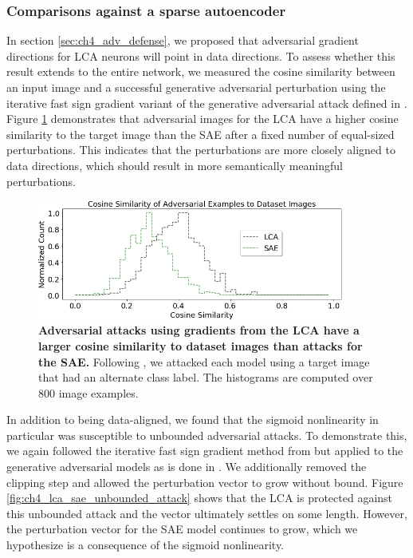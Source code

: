 \subsubsection{Comparisons against a sparse autoencoder}
In section \ref{sec:ch4_adv_defense}, we proposed that adversarial gradient directions for LCA neurons will point in data directions. To assess whether this result extends to the entire network, we measured the cosine similarity between an input image and a successful generative adversarial perturbation using the iterative fast sign gradient \parencite{kurakin2016adversarial} variant of the generative adversarial attack defined in \parencite{kos2018adversarial}. Figure \ref{fig:ch4_cosine_similarity} demonstrates that adversarial images for the LCA have a higher cosine similarity to the target image than the SAE after a fixed number of equal-sized perturbations. This indicates that the perturbations are more closely aligned to data directions, which should result in more semantically meaningful perturbations.

\begin{figure}[h]
    \centering
    \includegraphics[width=0.9\textwidth]{figures/cosyne_similarity.png}
    \caption{\textbf{Adversarial attacks using gradients from the LCA have a larger cosine similarity to dataset images than attacks for the SAE.} Following \parencite{kos2018adversarial, kurakin2016adversarial}, we attacked each model using a target image that had an alternate class label. The histograms are computed over 800 image examples.}
    \label{fig:ch4_cosine_similarity}
\end{figure}

In addition to being data-aligned, we found that the sigmoid nonlinearity in particular was susceptible to unbounded adversarial attacks. To demonstrate this, we again followed the iterative fast sign gradient method from \parencite{kurakin2016adversarial} but applied to the generative adversarial models as is done in \parencite{kos2018adversarial}. We additionally removed the clipping step and allowed the perturbation vector to grow without bound. Figure \ref{fig:ch4_lca_sae_unbounded_attack} shows that the LCA is protected against this unbounded attack and the vector ultimately settles on some length. However, the perturbation vector for the SAE model continues to grow, which we hypothesize is a consequence of the sigmoid nonlinearity.

